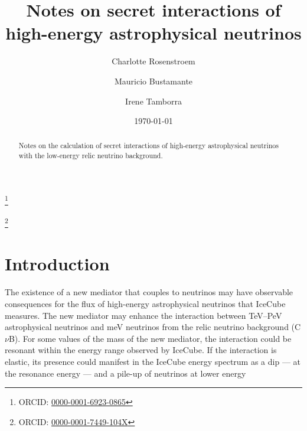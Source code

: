 \documentclass[aps,twocolumn,prd,showpacs,showkeys,preprintnumbers,superscriptaddress,nobibnotes,floatfix,longbibliography]{revtex4-1}
\begin{document}
 
\title{Notes on secret interactions of high-energy astrophysical neutrinos} 

\author{Charlotte Rosenstroem}

\author{Mauricio Bustamante}
\thanks{ORCID: \href{http://orcid.org/0000-0001-6923-0865}{0000-0001-6923-0865}}

\author{Irene Tamborra}
\thanks{ORCID: \href{http://orcid.org/0000-0001-7449-104X}{0000-0001-7449-104X}}


\date{\today}

\begin{abstract}
 Notes on the calculation of secret interactions of high-energy astrophysical neutrinos with the low-energy relic neutrino background.
\end{abstract}


\maketitle



\section{Introduction}\label{section:introduction}

The existence of a new mediator that couples to neutrinos may have observable consequences for the flux of high-energy astrophysical neutrinos that IceCube measures.  The new mediator may enhance the interaction between TeV--PeV astrophysical neutrinos and meV neutrinos from the relic neutrino background (C$\nu$B).  For some values of the mass of the new mediator, the interaction could be resonant within the energy range observed by IceCube.  If the interaction is elastic, its presence could manifest in the IceCube energy spectrum as a dip --- at the resonance energy --- and a pile-up of neutrinos at lower energy\ \cite{Ng:2014pca, Ioka:2014kca, Ibe:2014pja, DiFranzo:2015qea}
\end{document}
